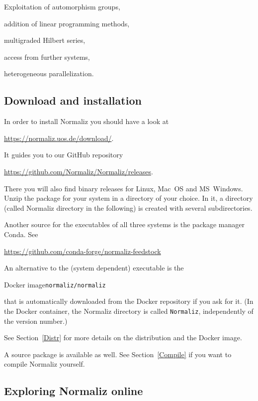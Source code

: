 \begin{arab}
	\item Exploitation of automorphism groups,
	\item addition of linear programming methods,
	\item multigraded Hilbert series,
	\item access from further systems,
	\item heterogeneous parallelization.
\end{arab}

\subsection{Download and installation}

In order to install Normaliz you should have a look at
\begin{center}
	\url{https://normaliz.uos.de/download/}.
\end{center}
It guides you to our GitHub repository
\begin{center}
	\url{https://github.com/Normaliz/Normaliz/releases}.
\end{center}
There you will also find binary releases for Linux, Mac~OS and MS~Windows. Unzip the package for your system in a directory of your choice. In it, a
directory \ttt{\NmzDir} (called Normaliz directory in the
following) is created with several subdirectories.

Another source for the executables of all three systems is the package manager Conda. See
\begin{center}
	\url{https://github.com/conda-forge/normaliz-feedstock}
\end{center}


An alternative to the (system dependent) executable is the
\begin{center}
	Docker image\qquad \verb|normaliz/normaliz|
\end{center}
that is automatically downloaded from the Docker repository if you ask for it. (In the Docker container, the Normaliz directory is called \verb|Normaliz|, independently of the version number.)

See Section~\ref{Distr} for more details on the distribution and the Docker image.

A source package is available as well. See Section~\ref{Compile} if you want to compile Normaliz yourself.

\subsection{Exploring Normaliz online}

